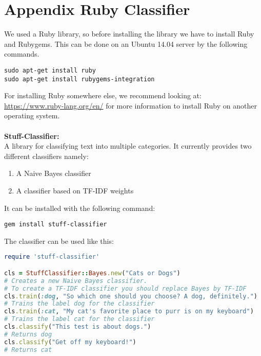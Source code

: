 \section{Appendix Ruby Classifier} \label{app:classifier}

We used a Ruby library, so before installing the library we have to install Ruby and Rubygems.
This can be done on an Ubuntu 14.04 server by the following commands. 
\begin{lstlisting}[frame=single]
sudo apt-get install ruby
sudo apt-get install rubygems-integration
\end{lstlisting}
For installing Ruby somewhere else, we recommend looking at: \url{ https://www.ruby-lang.org/en/} for more information to install Ruby on another operating system. \\
\\
\textbf{Stuff-Classifier:} \\
A library for classifying text into multiple categories.
It currently provides two different classifiers namely: 
\begin{enumerate}
\item A Naive Bayes classifier
\item A classifier based on TF-IDF weights
\end{enumerate}
It can be installed with the following command: 
\begin{lstlisting}[frame=single]
gem install stuff-classifier
\end{lstlisting}
The classifier can be used like this:

\begin{lstlisting}[language=Ruby]
require 'stuff-classifier'

cls = StuffClassifier::Bayes.new("Cats or Dogs")
# Creates a new Naive Bayes classifier.
# To create a TF-IDF classifier you should replace Bayes by TF-IDF
cls.train(:dog, "So which one should you choose? A dog, definitely.")
# Trains the label dog for the classifier
cls.train(:cat, "My cat's favorite place to purr is on my keyboard")
# Trains the label cat for the classifier
cls.classify("This test is about dogs.") 
# Returns dog
cls.classify("Get off my keyboard!") 
# Returns cat

\end{lstlisting}


\clearpage